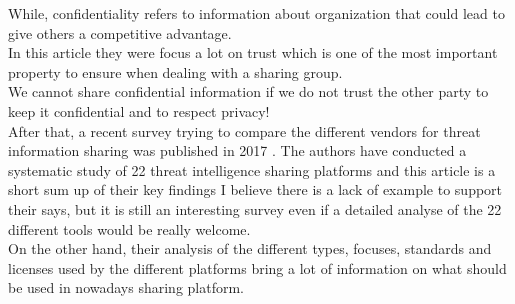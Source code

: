 \documentclass{eplmastersthesis}
\begin{document}
While, confidentiality refers to information about organization that could lead to give others a competitive advantage.\\
In this article they were focus a lot on trust which is one of the most important property to ensure when dealing with a sharing group.\\
We cannot share confidential information if we do not trust the other party to keep it confidential and to respect privacy! \\

After that, a recent survey trying to compare the different vendors for threat information sharing was published in 2017 \cite{sauerwein2017threat}. The authors have conducted a systematic study of 22 threat intelligence sharing platforms and this article is a short sum up of their key findings I believe there is a lack of example to support their says, but it is still an interesting survey even if a detailed analyse of the 22 different tools would be really welcome.\\
On the other hand, their analysis of the different types, focuses, standards and licenses used by the different platforms bring a lot of information on what should be used in nowadays sharing platform.\\
\end{document}
